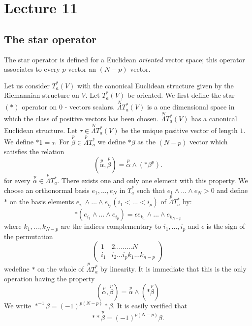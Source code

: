\chapter{Lecture 11}

\section*{The star operator}\pageoriginale

The star operator is defined for a Euclidean {\em oriented} vector
space; this operator associates to every $p$-vector an $(N-p)$ vector.

Let us consider $T^{\ast}_{a}(V)$ with the canonical Euclidean
structure given by the Riemannian structure on $V$. Let
$T^{\ast}_{a}(V)$ be oriented. We first define the star $(\ast)$
operator on $0$ - vectors \iec
scalars. $\overset{N}{\Lambda}T^{\ast}_{a}(V)$ is a one dimensional
space in which the class of positive vectors has been
chosen. $\overset{N}{\Lambda}T^{\ast}_{a}(V)$ has a canonical
Euclidean structure. Let $\tau\in \overset{N}{\Lambda}T^{\ast}_{a}(V)$
be the unique positive vector of length $1$. We define $\ast
1=\tau$. For $\overset{p}{\beta}\in\overset{p}{\Lambda}T^{\ast}_{a}$
we define $\ast\beta$ as the $(N-p)$ vector which satisfies the
relation
$$
(\overset{p}{\alpha},\overset{p}{\beta})=\overset{p}{\alpha}\wedge
(\ast\beta^{p}). 
$$
for every $\overset{p}{\alpha}\in
\overset{p}{\Lambda}T^{\ast}_{a}$. There exists one and only one
element with this property. We choose an orthonormal basis
$e_{1},\ldots,e_{N}$ in $T^{\ast}_{a}$ such that
$e_{1}\wedge\ldots\wedge e_{N}>0$ and define $\ast$ on the basis
elements $e_{i_{1}}\wedge\ldots\wedge e_{i_{p}}(i_{1}<\ldots<i_{p})$
of $\overset{p}{\Lambda}T^{\ast}_{a}$ by:
$$
\ast(e_{i_{1}}\wedge\ldots\wedge e_{i_{p}})=\epsilon
e_{k_{1}}\wedge\ldots\wedge e_{k_{N-p}}
$$
where $k_{1},\ldots,k_{N-p}$ are the indices complementary to
$i_{1},\ldots,i_{p}$ and $\epsilon$ is the sign of the permutation
$$
\begin{pmatrix}
1 & 2\ldots\ldots\ldots N\\
i_{1} & i_{2}\ldots i_{p}k_{1}\ldots k_{n-p}
\end{pmatrix}
$$
we\pageoriginale define $\ast$ on the whole of $\overset{p}{\Lambda}
T^{\ast}_{a}$ by linearity. It is immediate that this is the only
operation having the property
$$
(\overset{p}{\alpha},\overset{p}{\beta})=\overset{p}{\alpha}\wedge
(\ast\overset{p}{\beta}) 
$$
We write $\ast^{-1}\beta =(-1)^{p(N-p)}\ast\beta$. It is easily
verified that
$$
\ast\ast \overset{p}{\beta}=(-1)^{p(N-p)}\beta.
$$

